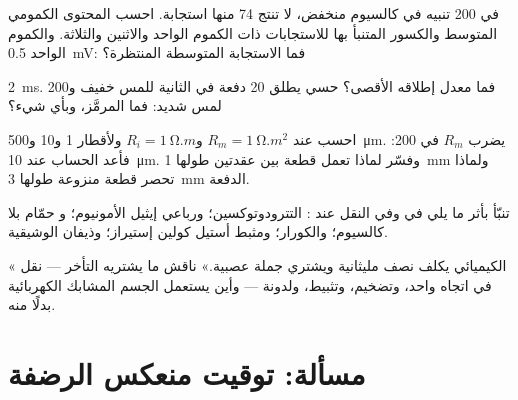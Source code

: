 \begin{exercise}[$\star\star$]\label{exo:b2:neurons-synapses:8}
في 200 تنبيه  في كالسيوم منخفض، لا تنتج 74 منها
استجابة. احسب المحتوى الكمومي المتوسط والكسور المتنبأ بها
للاستجابات ذات الكموم الواحد والاثنين والثلاثة. والكموم
الواحد \qty{0.5}{mV}: فما الاستجابة المتوسطة المنتظرة؟
\end{exercise}

\begin{exercise}[$\star\star$]\label{exo:b2:neurons-synapses:9}
  \qty{2}{ms}. فما معدل إطلاقه
الأقصى؟  حسي يطلق 20 دفعة في الثانية للمس خفيف
و200 لمس شديد: فما المرمَّز، وبأي شيء؟
\end{exercise}

\begin{exercise}[$\star\star\star$]\label{exo:b2:neurons-synapses:10}
احسب  عند $R_m = \qty{1}{\ohm.m^2}$ و$R_i =
\qty{1}{\ohm.m}$ ولأقطار 1 و10 و\qty{500}{\micro m}. 
يضرب $R_m$ في 200: فأعد الحساب عند \qty{10}{\micro m}. وفسّر
لماذا تعمل قطعة بين عقدتين طولها \qty{1}{mm} ولماذا تحصر قطعة منزوعة 
طولها \qty{3}{mm} الدفعة.
\end{exercise}

\begin{exercise}[$\star\star\star$]\label{exo:b2:neurons-synapses:11}
تنبّأ بأثر ما يلي في  وفي النقل عند
: التترودوتوكسين؛ ورباعي إيثيل الأمونيوم؛ و
حمّام بلا كالسيوم؛ والكورار؛ ومثبط أستيل كولين إستيراز؛
وذيفان الوشيقية.
\end{exercise}

\begin{exercise}[$\star\star\star$]\label{exo:b2:neurons-synapses:12}
« الكيميائي يكلف نصف مليثانية ويشتري جملة
عصبية.» ناقش ما يشتريه التأخر --- نقل في اتجاه واحد،
وتضخيم، وتثبيط، ولدونة --- وأين يستعمل الجسم المشابك
الكهربائية بدلًا منه.
\end{exercise}

\section{مسألة: توقيت منعكس الرضفة}

